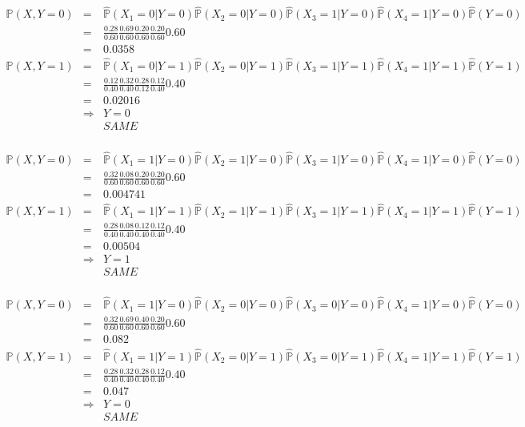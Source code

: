 \documentclass[12pt]{article}
\begin{document}
\begin{eqnarray*}
  \mathbb{P}(X, Y=0)
	&=& \hat{\mathbb{P}}(X_1=0|Y=0) \hat{\mathbb{P}}(X_2=0|Y=0)
	  \hat{\mathbb{P}}(X_3=1|Y=0) \hat{\mathbb{P}}(X_4=1|Y=0) \hat{\mathbb{P}}(Y=0)\\
	&=& \frac{0.28}{0.60} \frac{0.69}{0.60} \frac{0.20}{0.60} \frac{0.20}{0.60} 0.60 \\
	&=&  0.0358 \\ 
  \mathbb{P}(X, Y=1)
	&=& \hat{\mathbb{P}}(X_1=0|Y=1) \hat{\mathbb{P}}(X_2=0|Y=1)
	  \hat{\mathbb{P}}(X_3=1|Y=1) \hat{\mathbb{P}}(X_4=1|Y=1) \hat{\mathbb{P}}(Y=1)\\
	&=& \frac{0.12}{0.40} \frac{0.32}{0.40} \frac{0.28}{0.12} \frac{0.12}{0.40} 0.40 \\
	&=& 0.02016 \\
	&\Rightarrow& Y=0\\ 
	&& SAME \\
\end{eqnarray*}

\begin{eqnarray*}
  \mathbb{P}(X, Y=0)
	&=& \hat{\mathbb{P}}(X_1=1|Y=0) \hat{\mathbb{P}}(X_2=1|Y=0)
	  \hat{\mathbb{P}}(X_3=1|Y=0) \hat{\mathbb{P}}(X_4=1|Y=0) \hat{\mathbb{P}}(Y=0)\\
	&=& \frac{0.32}{0.60} \frac{0.08}{0.60} \frac{0.20}{0.60} \frac{0.20}{0.60} 0.60 \\
	&=&  0.004741\\ 
  \mathbb{P}(X, Y=1)
	&=& \hat{\mathbb{P}}(X_1=1|Y=1) \hat{\mathbb{P}}(X_2=1|Y=1)
	  \hat{\mathbb{P}}(X_3=1|Y=1) \hat{\mathbb{P}}(X_4=1|Y=1) \hat{\mathbb{P}}(Y=1)\\
	&=& \frac{0.28}{0.40} \frac{0.08}{0.40} \frac{0.12}{0.40} \frac{0.12}{0.40} 0.40 \\
	&=&  0.00504\\
	&\Rightarrow& Y=1\\ 
	&& SAME \\
\end{eqnarray*}

\begin{eqnarray*}
  \mathbb{P}(X, Y=0)
	&=& \hat{\mathbb{P}}(X_1=1|Y=0) \hat{\mathbb{P}}(X_2=0|Y=0)
	  \hat{\mathbb{P}}(X_3=0|Y=0) \hat{\mathbb{P}}(X_4=1|Y=0) \hat{\mathbb{P}}(Y=0)\\
	&=& \frac{0.32}{0.60} \frac{0.69}{0.60} \frac{0.40}{0.60} \frac{0.20}{0.60} 0.60 \\
	&=&  0.082\\ 
  \mathbb{P}(X, Y=1)
	&=& \hat{\mathbb{P}}(X_1=1|Y=1) \hat{\mathbb{P}}(X_2=0|Y=1)
	  \hat{\mathbb{P}}(X_3=0|Y=1) \hat{\mathbb{P}}(X_4=1|Y=1) \hat{\mathbb{P}}(Y=1)\\
	&=& \frac{0.28}{0.40} \frac{0.32}{0.40} \frac{0.28}{0.40} \frac{0.12}{0.40} 0.40 \\
	&=& 0.047 \\
	&\Rightarrow& Y=0\\ 
	&& SAME \\
\end{eqnarray*}
\end{document}
